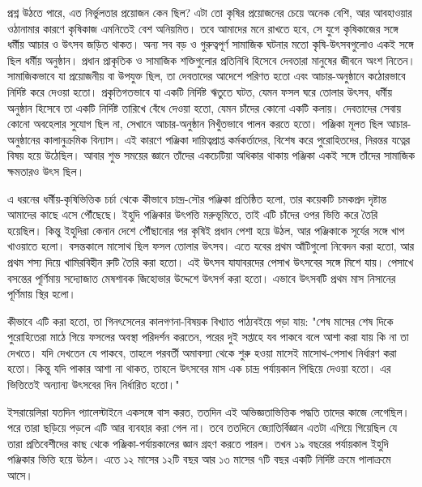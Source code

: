 প্রশ্ন উঠতে পারে, এত নির্ভুলতার প্রয়োজন কেন ছিল? এটা তো কৃষির প্রয়োজনের চেয়ে অনেক বেশি, আর আবহাওয়ার ওঠানামার কারণে কৃষিকাজ এমনিতেই বেশ অনিয়মিত। তবে আমাদের মনে রাখতে হবে, সে যুগে কৃষিকাজের সঙ্গে ধর্মীয় আচার ও উৎসব জড়িত থাকত। অন্য সব বড় ও গুরুত্বপূর্ণ সামাজিক ঘটনার মতো কৃষি-উৎসবগুলোও একই সঙ্গে ছিল ধর্মীয় অনুষ্ঠান। প্রধান প্রাকৃতিক ও সামাজিক শক্তিগুলোর প্রতিনিধি হিসেবে দেবতারা মানুষের জীবনে অংশ নিতেন। সামাজিকভাবে যা প্রয়োজনীয় বা উপযুক্ত ছিল, তা দেবতাদের আদেশে পরিণত হতো এবং আচার-অনুষ্ঠানে কঠোরভাবে নির্দিষ্ট করে দেওয়া হতো। প্রকৃতিগতভাবে যা একটি নির্দিষ্ট ঋতুতে ঘটত, যেমন ফসল ঘরে তোলার উৎসব, ধর্মীয় অনুষ্ঠান হিসেবে তা একটি নির্দিষ্ট তারিখে বেঁধে দেওয়া হতো, যেমন চাঁদের কোনো একটি কলায়। দেবতাদের সেবায় কোনো অবহেলার সুযোগ ছিল না, সেখানে আচার-অনুষ্ঠান নিখুঁতভাবে পালন করতে হতো। পঞ্জিকা মূলত ছিল আচার-অনুষ্ঠানের কালানুক্রমিক বিন্যাস। এই কারণে পঞ্জিকা দায়িত্বপ্রাপ্ত কর্মকর্তাদের, বিশেষ করে পুরোহিতদের, নিরন্তর যত্নের বিষয় হয়ে উঠেছিল। আবার শুভ সময়ের জ্ঞানে তাঁদের একচেটিয়া অধিকার থাকায় পঞ্জিকা একই সঙ্গে তাঁদের সামাজিক ক্ষমতারও উৎস ছিল।

এ ধরনের ধর্মীয়-কৃষিভিত্তিক চর্চা থেকে কীভাবে চান্দ্র-সৌর পঞ্জিকা প্রতিষ্ঠিত হলো, তার কয়েকটি চমকপ্রদ দৃষ্টান্ত আমাদের কাছে এসে পৌঁছেছে। ইহুদি পঞ্জিকার উৎপত্তি মরুভূমিতে, তাই এটি চাঁদের ওপর ভিত্তি করে তৈরি হয়েছিল। কিন্তু ইহুদিরা কেনান দেশে পৌঁছানোর পর কৃষিই প্রধান পেশা হয়ে উঠল, আর পঞ্জিকাকে সূর্যের সঙ্গে খাপ খাওয়াতে হলো। বসন্তকালে মাসোথ ছিল ফসল তোলার উৎসব। এতে যবের প্রথম আঁটিগুলো নিবেদন করা হতো, আর প্রথম শস্য দিয়ে খামিরবিহীন রুটি তৈরি করা হতো। এই উৎসব যাযাবরদের পেসাখ উৎসবের সঙ্গে মিশে যায়। পেসাখে বসন্তের পূর্ণিমায় সদ্যোজাত মেষশাবক জিহোভার উদ্দেশে উৎসর্গ করা হতো। এভাবে উৎসবটি প্রথম মাস নিসানের পূর্ণিমায় স্থির হলো।

কীভাবে এটি করা হতো, তা গিনৎসেলের কালগণনা-বিষয়ক বিখ্যাত পাঠ্যবইয়ে পড়া যায়: "শেষ মাসের শেষ দিকে পুরোহিতেরা মাঠে গিয়ে ফসলের অবস্থা পরিদর্শন করতেন, পরের দুই সপ্তাহে যব পাকবে বলে আশা করা যায় কি না তা দেখতে। যদি দেখতেন যে পাকবে, তাহলে পরবর্তী অমাবস্যা থেকে শুরু হওয়া মাসেই মাসোথ-পেসাখ নির্ধারণ করা হতো। কিন্তু যদি পাকার আশা না থাকত, তাহলে উৎসবের মাস এক চান্দ্র পর্যায়কাল পিছিয়ে দেওয়া হতো। এর ভিত্তিতেই অন্যান্য উৎসবের দিন নির্ধারিত হতো।"

ইসরায়েলিরা যতদিন প্যালেস্টাইনে একসঙ্গে বাস করত, ততদিন এই অভিজ্ঞতাভিত্তিক পদ্ধতি তাদের কাজে লেগেছিল। পরে তারা ছড়িয়ে পড়লে এটি আর ব্যবহার করা গেল না। তবে ততদিনে জ্যোতির্বিজ্ঞান এতটা এগিয়ে গিয়েছিল যে তারা প্রতিবেশীদের কাছ থেকে পঞ্জিকা-পর্যায়কালের জ্ঞান গ্রহণ করতে পারল। তখন ১৯ বছরের পর্যায়কাল ইহুদি পঞ্জিকার ভিত্তি হয়ে উঠল। এতে ১২ মাসের ১২টি বছর আর ১৩ মাসের ৭টি বছর একটি নির্দিষ্ট ক্রমে পালাক্রমে আসে।

